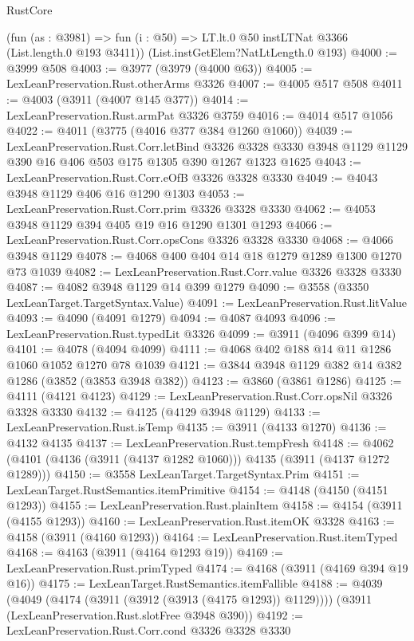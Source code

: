 \begin{lexlean}{RustCore}
\begin{coremodule}
    (fun (as : @3981) =>
    fun (i : @50) => LT.lt.{0} @50 instLTNat @3366 (List.length.{0} @193 @3411))
    (List.instGetElem?NatLtLength.{0} @193)
@4000 := @3999 @508
@4003 := @3977 (@3979 (@4000 @63))
@4005 := LexLeanPreservation.Rust.otherArms @3326
@4007 := @4005 @517 @508
@4011 := @4003 (@3911 (@4007 @145 @377))
@4014 := LexLeanPreservation.Rust.armPat @3326 @3759
@4016 := @4014 @517 @1056
@4022 := @4011 (@3775 (@4016 @377 @384 @1260 @1060))
@4039 := LexLeanPreservation.Rust.Corr.letBind
    @3326
    @3328
    @3330
    @3948
    @1129
    @1129
    @390
    @16
    @406
    @503
    @175
    @1305
    @390
    @1267
    @1323
    @1625
@4043 := LexLeanPreservation.Rust.Corr.eOfB @3326 @3328 @3330
@4049 := @4043 @3948 @1129 @406 @16 @1290 @1303
@4053 := LexLeanPreservation.Rust.Corr.prim @3326 @3328 @3330
@4062 := @4053 @3948 @1129 @394 @405 @19 @16 @1290 @1301 @1293
@4066 := LexLeanPreservation.Rust.Corr.opsCons @3326 @3328 @3330
@4068 := @4066 @3948 @1129
@4078 := @4068 @400 @404 @14 @18 @1279 @1289 @1300 @1270 @73 @1039
@4082 := LexLeanPreservation.Rust.Corr.value @3326 @3328 @3330
@4087 := @4082 @3948 @1129 @14 @399 @1279
@4090 := @3558 (@3350 LexLeanTarget.TargetSyntax.Value)
@4091 := LexLeanPreservation.Rust.litValue
@4093 := @4090 (@4091 @1279)
@4094 := @4087 @4093
@4096 := LexLeanPreservation.Rust.typedLit @3326
@4099 := @3911 (@4096 @399 @14)
@4101 := @4078 (@4094 @4099)
@4111 := @4068 @402 @188 @14 @11 @1286 @1060 @1052 @1270 @78 @1039
@4121 := @3844 @3948 @1129 @382 @14 @382 @1286 (@3852 (@3853 @3948 @382))
@4123 := @3860 (@3861 @1286)
@4125 := @4111 (@4121 @4123)
@4129 := LexLeanPreservation.Rust.Corr.opsNil @3326 @3328 @3330
@4132 := @4125 (@4129 @3948 @1129)
@4133 := LexLeanPreservation.Rust.isTemp
@4135 := @3911 (@4133 @1270)
@4136 := @4132 @4135
@4137 := LexLeanPreservation.Rust.tempFresh
@4148 := @4062 (@4101 (@4136 (@3911 (@4137 @1282 @1060))) @4135 (@3911 (@4137 @1272 @1289)))
@4150 := @3558 LexLeanTarget.TargetSyntax.Prim
@4151 := LexLeanTarget.RustSemantics.itemPrimitive
@4154 := @4148 (@4150 (@4151 @1293))
@4155 := LexLeanPreservation.Rust.plainItem
@4158 := @4154 (@3911 (@4155 @1293))
@4160 := LexLeanPreservation.Rust.itemOK @3328
@4163 := @4158 (@3911 (@4160 @1293))
@4164 := LexLeanPreservation.Rust.itemTyped
@4168 := @4163 (@3911 (@4164 @1293 @19))
@4169 := LexLeanPreservation.Rust.primTyped
@4174 := @4168 (@3911 (@4169 @394 @19 @16))
@4175 := LexLeanTarget.RustSemantics.itemFallible
@4188 := @4039
    (@4049 (@4174 (@3911 (@3912 (@3913 (@4175 @1293)) @1129))))
    (@3911 (LexLeanPreservation.Rust.slotFree @3948 @390))
@4192 := LexLeanPreservation.Rust.Corr.cond @3326 @3328 @3330

\end{coremodule}
\end{lexlean}
